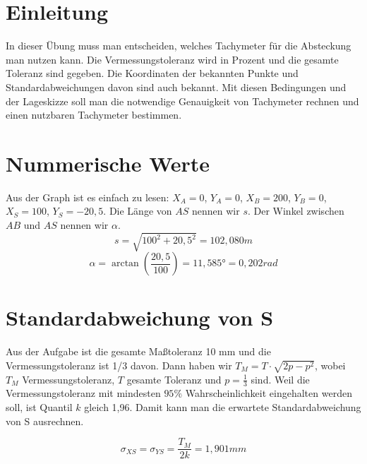 \documentclass[12pt]{article}
\begin{document}
	\pagestyle{main}
\tableofcontents
\newpage
\section{Einleitung}
In dieser Übung muss man entscheiden, welches Tachymeter für die Absteckung man nutzen kann. Die Vermessungstoleranz wird in Prozent und die gesamte Toleranz sind gegeben. Die Koordinaten der bekannten Punkte und Standardabweichungen davon sind auch bekannt. Mit diesen Bedingungen und der Lageskizze soll man die notwendige Genauigkeit von Tachymeter rechnen und einen nutzbaren Tachymeter bestimmen. 
\section{Nummerische Werte}
Aus der Graph ist es einfach zu lesen: $X_A = 0$, $Y_A = 0$, $X_B = 200$, $Y_B = 0$, $X_S = 100$, $Y_ S = -20,5$. Die Länge von $AS$ nennen wir $s$. Der Winkel zwischen $AB$ und $AS$ nennen wir $\alpha$. 
\begin{equation*}
s = \sqrt{100^2 + 20,5^2} = 102,080 m
\end{equation*}
\begin{equation*}
\alpha = \arctan(\frac{20,5}{100}) = 11,585° = 0,202 rad
\end{equation*}
\section{Standardabweichung von S}
Aus der Aufgabe ist die gesamte Maßtoleranz 10 mm und die Vermessungstoleranz ist 1/3 davon. Dann haben wir $T_M = T \cdot \sqrt{2p - p^2}$, wobei $T_M$ Vermessungstoleranz, $T$ gesamte Toleranz und $p = \frac{1}{3}$ sind. Weil die Vermessungstoleranz mit mindesten $95 \%$ Wahrscheinlichkeit eingehalten werden soll, ist Quantil $k$ gleich 1,96. Damit kann man die erwartete Standardabweichung von S ausrechnen.

\begin{equation*}
\sigma_{XS} = \sigma_{YS} = \frac{T_M}{2k} = 1,901 mm
\end{equation*}
\newpage
\end{document}
